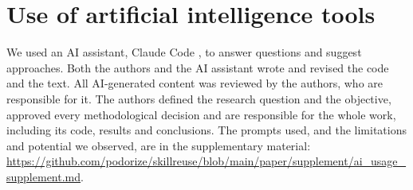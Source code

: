\section{Use of artificial intelligence
tools}\label{use-of-artificial-intelligence-tools}

We used an AI assistant, Claude Code \cite{claude_code}, to answer
questions and suggest approaches. Both the authors and the AI assistant
wrote and revised the code and the text. All AI-generated content was
reviewed by the authors, who are responsible for it. The authors defined
the research question and the objective, approved every methodological
decision and are responsible for the whole work, including its code,
results and conclusions. The prompts used, and the limitations and
potential we observed, are in the supplementary material:
\url{https://github.com/podorize/skillreuse/blob/main/paper/supplement/ai_usage_supplement.md}.
